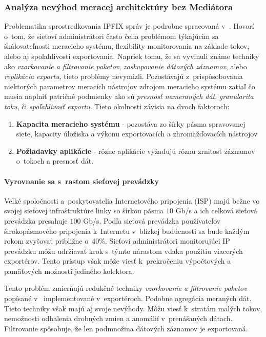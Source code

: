 \subsubsection{Anal\'yza nev\'yhod meracej architekt\'ury bez Medi\'atora}


Problematika sprostredkovania IPFIX správ je podrobne spracovaná v~\citep{rfc5982}. 
Hovorí o~tom, že sieťoví administrátori často čelia problémom týkajúcim sa škálovateľnosti meracieho 
systému, flexibility monitorovania na základe tokov, alebo aj spoľahlivosti exportovania.
Napriek tomu, že sa vyvinuli známe techniky ako \emph{vzorkovanie a filtrovanie  paketov}, \emph{zoskupovanie 
dátových záznamov}, alebo \emph{replikácia exportu}, tieto problémy nevymizli.
Pozostávajú z~prispôsobovania niektorých parametrov meracích nástrojov zdrojom meracieho 
systému zatiaľ čo musia naplniť patričné podmienky ako sú \emph{presnosť nameraných dát}, \emph{granularita 
toku}, či \emph{spoľahlivosť exportu}. Tieto okolnosti závisia na dvoch faktoroch:
\begin{enumerate}
 \item \textbf{Kapacita  meracieho systému} - pozostáva zo šírky pásma  spravovanej siete, kapacity 
 úložiska a výkonu exportovacích a zhromažďovacích nástrojov
 
 \item \textbf{Požiadavky aplikácie} - rôzne aplikácie vyžadujú rôznu zrnitosť záznamov o~tokoch a presnosť dát.
\end{enumerate}



\paragraph{Vyrovnanie sa s~rastom sieťovej prev\'adzky}

Veľké spoločnosti a~poskytovatelia Internetového pripojenia (ISP) majú bežne vo svojej sieťovej 
infraštruktúre linky so šírkou pásma $10$ Gb/s a ich celková sieťová prevádzka presahuje $100$ Gb/s. 
Podľa \citep{trafgrw} sieťová prevádzka používateľov širokopásmového pripojenia
k~Internetu v~blízkej budúcnosti sa bude každým rokom zvyšovať približne o~$40\%$. Sieťoví administrátori
monitorujúci IP prevádzku môžu udržiavať krok s~týmto nárastom vďaka použitiu viacerých exportérov. 
Tento prístup však môže viesť k~prekročeniu výpočtových a pamäťových možností jediného kolektora.

Tento problém zmierňujú redukčné techniky \emph{vzorkovanie a filtrovanie paketov} popísané v~\citep{rfc5475}
implementované v~exportéroch. Podobne agregácia meraných dát. Tieto techniky však majú aj svoje nevýhody. 
Môžu viesť k~stratám malých tokov, nemožnosti odhalenia drobných zmien a anomálií v~prenášaných dátach. 
Filtrovanie spôsobuje, že len podmnožina dátových záznamov je exportovaná.

